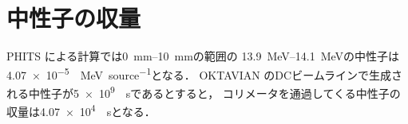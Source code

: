 \documentclass[../master]{subfiles}
\begin{document}

\section{中性子の収量}
PHITS による計算では\SIrange{0}{10}{\milli\metre}の範囲の
\SIrange{13.9}{14.1}{\mega\electronvolt}の中性子は
\SI{4.07e-5}{\per\mega\electronvolt\per source}となる．
OKTAVIAN のDCビームラインで生成される中性子が\SI{5e9}{\per\second}であるとすると，
コリメータを通過してくる中性子の収量は\SI{4.07e4}{\per\second}となる．
\end{document}
